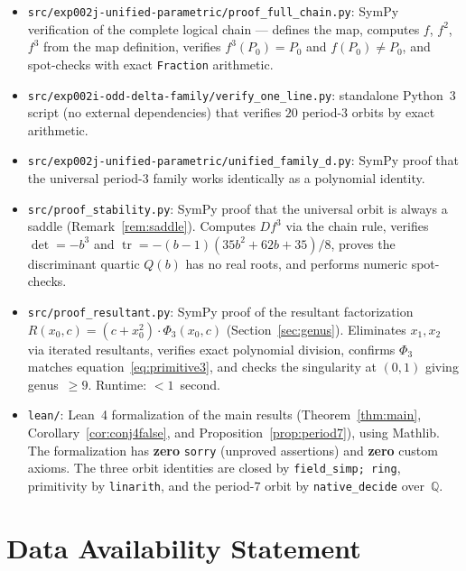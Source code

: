 \documentclass[11pt]{article}
\theoremstyle{definition}
\theoremstyle{remark}
\begin{document}
\begin{itemize}
  \item \texttt{src/exp002j-unified-parametric/proof\_full\_chain.py}: SymPy
  verification of the complete logical chain --- defines the map, computes $f$,
  $f^2$, $f^3$ from the map definition, verifies $f^3(P_0) = P_0$ and
  $f(P_0) \neq P_0$, and spot-checks with exact \texttt{Fraction} arithmetic.

  \item \texttt{src/exp002i-odd-delta-family/verify\_one\_line.py}: standalone
  Python~3 script (no external dependencies) that verifies $20$ period-$3$ orbits
  by exact arithmetic.

  \item \texttt{src/exp002j-unified-parametric/unified\_family\_d.py}: SymPy proof
  that the universal period-$3$ family works identically as a polynomial identity.

  \item \texttt{src/proof\_stability.py}: SymPy proof that the universal orbit is
  always a saddle (Remark~\ref{rem:saddle}). Computes $Df^3$ via the chain rule,
  verifies $\det = -b^3$ and $\operatorname{tr} = -(b-1)(35b^2+62b+35)/8$,
  proves the discriminant quartic $Q(b)$ has no real roots, and performs numeric
  spot-checks.

  \item \texttt{src/proof\_resultant.py}: SymPy proof of the resultant factorization
  $R(x_0,c) = (c+x_0^2)\cdot\Phi_3(x_0,c)$ (Section~\ref{sec:genus}).
  Eliminates $x_1, x_2$ via iterated resultants, verifies exact polynomial division,
  confirms $\Phi_3$ matches equation~\eqref{eq:primitive3}, and checks the
  singularity at $(0,1)$ giving genus~$\geq 9$.  Runtime: $< 1$~second.

  \item \texttt{lean/}: Lean~4 formalization of the main results
  (Theorem~\ref{thm:main}, Corollary~\ref{cor:conj4false}, and
  Proposition~\ref{prop:period7}), using Mathlib. The formalization has
  \textbf{zero} \texttt{sorry} (unproved assertions) and \textbf{zero}
  custom axioms. The three orbit identities are closed by \texttt{field\_simp; ring},
  primitivity by \texttt{linarith}, and the period-$7$ orbit by \texttt{native\_decide}
  over~$\mathbb{Q}$.
\end{itemize}


\section*{Data Availability Statement}
\end{document}
